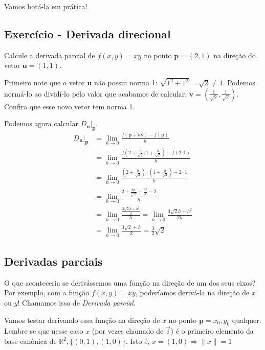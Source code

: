 \documentclass[
  letterpaper,
  DIV=11,
  numbers=noendperiod]{scrreprt}
\begin{document}
Vamos botá-la em prática!

\subsection{Exercício - Derivada
direcional}\label{exercuxedcio---derivada-direcional}

Calcule a derivada parcial de \(f(x,y) = xy\) no ponto
\(\pmb{p} = (2,1)\) na direção do vetor \(\pmb{u} = (1,1)\).

Primeiro note que o vetor \(\pmb{u}\) não possui norma 1:
\(\sqrt{1^2+1^2}=\sqrt{2}\neq 1\). Podemos normá-lo ao dividí-lo pelo
valor que acabamos de calcular:
\(\pmb{v} = \left(\frac{1}{\sqrt{2}}, \frac{1}{\sqrt{2}}\right)\).
Confira que esse novo vetor tem norma 1.

Podemos agora calcular \(D_{\pmb{u}}\rvert_{\pmb{p}}\). \[
\begin{aligned}
D_{\pmb{u}}\rvert_{\pmb{p}} &= \lim_{h \rightarrow 0}
\frac{f(\pmb{p} + h\pmb{v})-f(\pmb{p})}{h} \\
&= \lim_{h\rightarrow 0} \frac{f\left(2+\frac{h}{\sqrt{2}},1+\frac{h}{\sqrt{2}}\right)-f(2,1)}{h} \\
& = \lim_{h\rightarrow 0} \frac{\left(2+\frac{h}{\sqrt{2}}\right)\cdot\left(1+\frac{h}{\sqrt{2}}\right) - 2\cdot 1}{h} \\
&= \lim_{h\rightarrow 0} \frac{2 + \frac{3h}{\sqrt{2}} + \frac{h^2}{2} - 2}{h} \\
& = \lim_{h\rightarrow 0} \frac{\frac{3\sqrt{2}h + h^2}{2}}{h} =
\lim_{h\rightarrow 0} \frac{3\sqrt{2}h+h^2}{2h}\\
&= \lim_{h\rightarrow 0} \frac{3\sqrt{2} + h}{2} = \frac{3}{2}\sqrt{2}
\end{aligned}
\]

\subsection{Derivadas parciais}\label{derivadas-parciais}

O que aconteceria se derivássemos uma função na direção de um dos seus
eixos? Por exemplo, com a função \(f(x,y) = xy\), poderíamos derivá-la
na direção de \(x\) ou \(y\)! Chamamos isso de \emph{Derivada parcial}.

Vamos testar derivando essa função na direção de \(x\) no ponto
\(\pmb{p} = x_0, y_0\) qualquer. Lembre-se que nesse caso \(x\) (por
vezes chamado de \(\vec{i}\)) é o primeiro elemento da base canônica de
\(\mathbb{R}^2, \{(0,1),(1,0)\}\). Isto é,
\(x = (1,0) \Rightarrow \lVert x \rVert = 1\)
\end{document}
